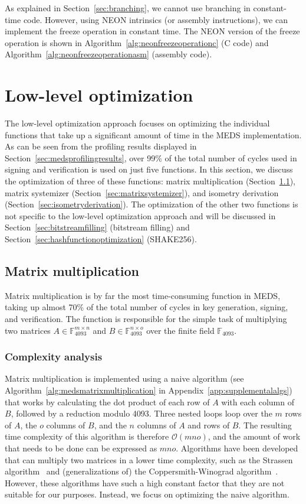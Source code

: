 \documentclass[11pt,a4paper]{report}
\theoremstyle{definition}
\begin{document}
As explained in Section~\ref{sec:branching}, we cannot use branching in constant-time code. However, using NEON intrinsics (or assembly instructions), we can implement the freeze operation in constant time. The NEON version of the freeze operation is shown in Algorithm~\ref{alg:neonfreezeoperationc} (C code) and Algorithm~\ref{alg:neonfreezeoperationasm} (assembly code).

\section{Low-level optimization}
\label{sec:lowleveloptimization}
The low-level optimization approach focuses on optimizing the individual functions that take up a significant amount of time in the MEDS implementation. As can be seen from the profiling results displayed in Section~\ref{sec:medsprofilingresults}, over 99\% of the total number of cycles used in signing and verification is used on just five functions. In this section, we discuss the optimization of three of these functions: matrix multiplication (Section~\ref{sec:matrixmultiplication}), matrix systemizer (Section~\ref{sec:matrixsystemizer}), and isometry derivation (Section~\ref{sec:isometryderivation}). The optimization of the other two functions is not specific to the low-level optimization approach and will be discussed in Section~\ref{sec:bitstreamfilling} (bitstream filling) and Section~\ref{sec:hashfunctionoptimization} (SHAKE256).

\subsection{Matrix multiplication}
\label{sec:matrixmultiplication}
Matrix multiplication is by far the most time-consuming function in MEDS, taking up almost 70\% of the total number of cycles in key generation, signing, and verification. The function is responsible for the simple task of multiplying two matrices $A \in \mathbb{F}_{4093}^{m \times n}$ and $B \in \mathbb{F}_{4093}^{n \times o}$ over the finite field $\mathbb{F}_{4093}$.

\subsubsection{Complexity analysis}
\label{sec:matrixmultiplicationcomplexity}
Matrix multiplication is implemented using a naive algorithm (see Algorithm~\ref{alg:medsmatrixmultiplication} in Appendix~\ref{app:supplementalalgs}) that works by calculating the dot product of each row of $A$ with each column of $B$, followed by a reduction modulo 4093. Three nested loops loop over the $m$ rows of $A$, the $o$ columns of $B$, and the $n$ columns of $A$ and rows of $B$. The resulting time complexity of this algorithm is therefore $\mathcal{O}(mno)$, and the amount of work that needs to be done can be expressed as $mno$. Algorithms have been developed that can multiply two matrices in a lower time complexity, such as the Strassen algorithm~\cite{strassen1969gaussian} and (generalizations of) the Coppersmith-Winograd algorithm~\cite{coppersmith1987matrix}. However, these algorithms have such a high constant factor that they are not suitable for our purposes. Instead, we focus on optimizing the naive algorithm.
\end{document}
